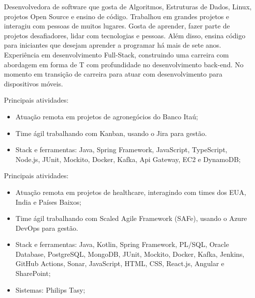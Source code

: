 \documentclass[10pt,a4paper,ragged2e,withhyper]{assets/class/altacv}
\begin{document}


\makecvheader


\begin{paracol}{2}


  Desenvolvedora de software que gosta de Algoritmos, Estruturas de Dados, Linux, projetos Open Source e ensino de código. Trabalhou em grandes projetos e interagiu com pessoas de muitos lugares. Gosta de aprender, fazer parte de projetos desafiadores, lidar com tecnologias e pessoas. Além disso, ensina código para iniciantes que desejam aprender a programar há mais de sete anos. Experiência em desenvolvimento Full-Stack, construindo uma carreira com abordagem em forma de T com profundidade no desenvolvimento back-end. No momento em transição de carreira para atuar com desenvolvimento para dispositivos móveis.

  \medskip


  Principais atividades:
  \begin{itemize}
    \item Atuação remota em projetos de agronegócios do Banco Itaú;
    \item Time ágil trabalhando com Kanban, usando o Jira para gestão.
    \item Stack e ferramentas: Java, Spring Framework, JavaScript, TypeScript, Node.js, JUnit, Mockito, Docker, Kafka, Api Gateway, EC2 e DynamoDB;
  \end{itemize}

  \divider

  Principais atividades:
  \begin{itemize}
    \item Atuação remota em projetos de healthcare, interagindo com times dos EUA, India e Países Baixos;
    \item Time ágil trabalhando com Scaled Agile Framework (SAFe), usando o Azure DevOps para gestão.
    \item Stack e ferramentas: Java, Kotlin, Spring Framework, PL/SQL, Oracle Database, PostgreSQL, MongoDB, JUnit, Mockito, Docker, Kafka, Jenkins, GitHub Actions, Sonar, JavaScript, HTML, CSS, React.js, Angular e SharePoint;
    \item Sistemas: Philips Tasy;
  \end{itemize}


\end{paracol}
\end{document}
